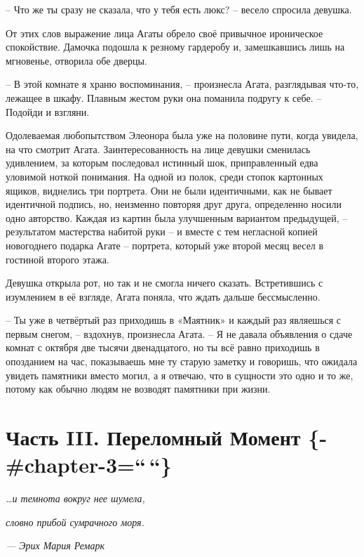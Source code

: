 \documentclass[
  a5paperpaper,
  DIV=11,
  numbers=noendperiod]{scrreprt}
\begin{document}
-- Что же ты сразу не сказала, что у тебя есть люкс? -- весело спросила
девушка.

От этих слов выражение лица Агаты обрело своё привычное ироническое
спокойствие. Дамочка подошла к резному гардеробу и, замешкавшись лишь на
мгновенье, отворила обе дверцы.

-- В этой комнате я храню воспоминания, -- произнесла Агата, разглядывая
что-то, лежащее в шкафу. Плавным жестом руки она поманила подругу к
себе. -- Подойди и взгляни.

Одолеваемая любопытством Элеонора была уже на половине пути, когда
увидела, на что смотрит Агата. Заинтересованность на лице девушки
сменилась удивлением, за которым последовал истинный шок, приправленный
едва уловимой ноткой понимания. На одной из полок, среди стопок
картонных ящиков, виднелись три портрета. Они не были идентичными, как
не бывает идентичной подпись, но, неизменно повторяя друг друга,
определенно носили одно авторство. Каждая из картин была улучшенным
вариантом предыдущей, -- результатом мастерства набитой руки -- и вместе
с тем негласной копией новогоднего подарка Агате -- портрета, который
уже второй месяц весел в гостиной второго этажа.

Девушка открыла рот, но так и не смогла ничего сказать. Встретившись с
изумлением в её взгляде, Агата поняла, что ждать дальше бессмысленно.

-- Ты уже в четвёртый раз приходишь в «Маятник» и каждый раз являешься с
первым снегом, -- вздохнув, произнесла Агата. -- Я не давала объявления
о сдаче комнат с октября две тысячи двенадцатого, но ты всё равно
приходишь в опозданием на час, показываешь мне ту старую заметку и
говоришь, что ожидала увидеть памятники вместо могил, а я отвечаю, что в
сущности это одно и то же, потому как обычно людям не возводят памятники
при жизни.


\chapter{Часть III. Переломный Момент
\{-\#chapter-3=``\,``\}}\label{ux447ux430ux441ux442ux44c-iii.-ux43fux435ux440ux435ux43bux43eux43cux43dux44bux439-ux43cux43eux43cux435ux43dux442--chapter-3}

\emph{\ldots и темнота вокруг нее шумела, }

\emph{словно прибой сумрачного моря.}

\emph{--- Эрих Мария Ремарк}
\end{document}
